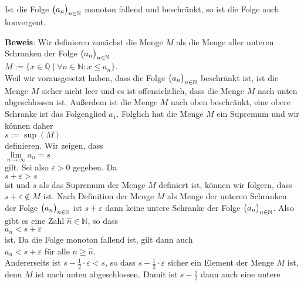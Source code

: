 \begin{Satz} \label{satz:monoton}
Ist die Folge $\bigl(a_n\bigr)_{n\in\mathbb{N}}$ monoton fallend und beschr\"ankt, so ist die Folge auch konvergent.
\end{Satz}
\textbf{Beweis}:  Wir definieren zun\"achst die Menge $M$ als die Menge aller unteren Schranken der Folge $\bigl(a_n\bigr)_{n\in\mathbb{N}}$
\\[0.2cm]
\hspace*{1.3cm}      
$M := \bigl\{ x \in \mathbb{Q} \mid \forall n \in \mathbb{N}: x \leq a_n \bigr\}$.
\\[0.2cm]
Weil wir vorausgesetzt haben, dass die Folge $\bigl(a_n\bigr)_{n\in\mathbb{N}}$ beschr\"ankt ist,
ist die Menge $M$ sicher nicht leer und es ist offensichtlich, dass die Menge $M$ nach unten abgeschlossen ist.  
Au\ss{}erdem ist die Menge $M$ nach oben beschr\"ankt, eine obere Schranke ist das Folgenglied $a_1$.
Folglich hat die Menge $M$ ein Supremum und wir k\"onnen daher   
\\[0.2cm]
\hspace*{1.3cm}
$s := \sup(M)$
\\[0.2cm]
definieren.  Wir zeigen, dass
\\[0.2cm]
\hspace*{1.3cm}
$\lim\limits_{n\rightarrow\infty} a_n = s$
\\[0.2cm]
gilt.  Sei also $\varepsilon > 0$ gegeben.  Da 
\\[0.2cm]
\hspace*{1.3cm}
$s + \varepsilon > s$
\\[0.2cm]
ist und $s$ als das Supremum der Menge $M$ definiert ist, k\"onnen wir folgern, dass 
$s + \varepsilon \not\in M$ ist.  Nach Definition der Menge $M$ als Menge der unteren Schranken der
Folge $\bigl(a_n\bigr)_{n\in\mathbb{N}}$ ist $s + \varepsilon$ dann keine untere Schranke der Folge $\bigl(a_n\bigr)_{n\in\mathbb{N}}$.  Also
 gibt es eine Zahl $\widehat{n} \in \mathbb{N}$, so dass 
\\[0.2cm]
\hspace*{1.3cm}
$a_{\widehat{n}} < s + \varepsilon$ 
\\[0.2cm]
ist.  Da die Folge monoton fallend ist, gilt dann auch
\\[0.2cm]
\hspace*{1.3cm}
$a_n < s + \varepsilon$ \quad f\"ur alle $n \geq \widehat{n}$.
\\[0.2cm]
Andererseits ist $s - \frac{1}{2} \cdot \varepsilon < s$, so dass $s - \frac{1}{2} \cdot \varepsilon$ sicher ein Element der Menge $M$
ist, denn $M$ ist nach unten abgeschlossen.  Damit ist $s - \frac{1}{2}$ dann auch eine untere
